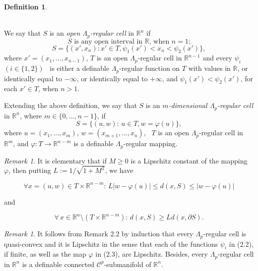 \documentclass[12pt]{amsart}
\theoremstyle{definition}
\newtheorem{defn}[thm]{Definition}
\theoremstyle{remark}
\newtheorem{rem}[thm]{Remark}
\numberwithin{equation}{section}
\newcommand{\Real}{\mathbb R}
\begin{document}
\medskip
\begin{defn}
$\phantom{.......................................................................................................................}$

\medskip
 We say that $S$ is an \emph{open $\varLambda_p$-regular cell} in $\Real^n$ if
\begin{equation}
\text{$S$ is any open interval in $\Real$, when $n = 1$;}
\end{equation}
\begin{equation}
S = \{(x', x_n): x'\in T, \psi_1(x') < x_n < \psi_2(x')\},
\end{equation}
where $x' = (x_1,\dots, x_{n-1})$, $T$ is an open $\varLambda_p$-regular cell in $\Real^{n-1}$ and every $\psi_i$ \, $(i\in \{1, 2\})$ \, is either a definable $\varLambda_p$-regular function on $T$ with values in $\Real$, or identically equal to $-\infty$, or identically equal to $+\infty$, and $\psi_1(x') < \psi_2(x')$, for each $x'\in T$, when $n > 1$.

\medskip
Extending the above definition, we say that $S$ is an \emph{$m$-dimensional $\varLambda_p$-regular cell} in $\Real^n$, where $m\in \{0,\dots, n-1\}$, if
\begin{equation}
S = \{(u, w): \, u\in T, w = \varphi(u)\},
\end{equation}
where $u = (x_1,\dots, x_m)$, $w = (x_{m+1},\dots, x_n)$, \, $T$ is an open $\varLambda_p$-regular cell in $\Real^m$, and $\varphi: T\longrightarrow \Real^{n-m}$ is a definable $\varLambda_p$-regular mapping.
\end{defn}

\medskip
\begin{rem}
It is elementary that if $M\geq 0$ is a Lipschitz constant of the mapping $\varphi$, then putting $L := 1/\sqrt{1 + M^2}$, we have

\begin{equation}
\forall x = (u, w)\in T\times \Real^{n-m}: \, L|w - \varphi(u)| \leq d(x, S) \leq |w - \varphi(u)|
\end{equation}

and

\begin{equation}
\forall \, x\in \Real^n\setminus (T\times \Real^{n-m}): \, d(x, S) \geq L d(x, \partial S).
\end{equation}
\end{rem}


\medskip
\begin{rem} It follows from Remark 2.2 by induction that every $\varLambda_p$-regular cell is quasi-convex and it is Lipschitz in the sense that each of the functions $\psi_i$ in (2.2), if finite, as well as the map $\varphi$ in (2.3), are Lipschitz. Besides, every $\varLambda_p$-regular cell in $\Real^n$ is a definable connected $\mathcal C^p$-submanifold of $\Real^n$.
\end{rem}
\end{document}
